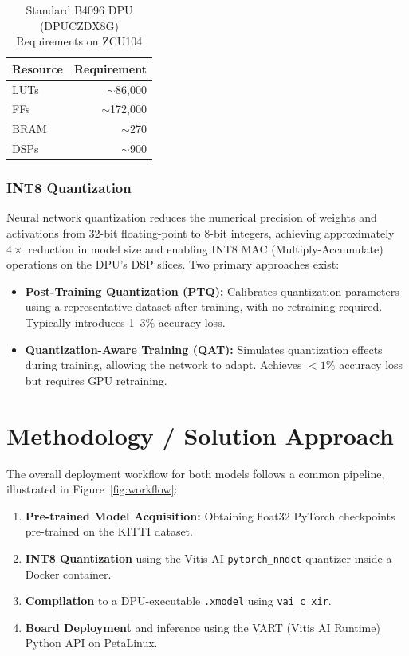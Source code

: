 \documentclass[12pt, a4paper]{report}
\begin{document}
\begin{table}[H]
\centering
\caption{Standard B4096 DPU (DPUCZDX8G) Requirements on ZCU104}
\label{tab:dpu_arch_req}
\begin{tabular}{@{}lr@{}}
\toprule
\textbf{Resource} & \textbf{Requirement} \\
\midrule
LUTs & $\sim$86,000 \\
FFs & $\sim$172,000 \\
BRAM & $\sim$270 \\
DSPs & $\sim$900 \\
\bottomrule
\end{tabular}
\end{table}

\subsection{INT8 Quantization}
Neural network quantization \cite{quantwhitepaper2021} reduces the numerical precision of weights and activations from 32-bit floating-point to 8-bit integers, achieving approximately $4\times$ reduction in model size and enabling INT8 MAC (Multiply-Accumulate) operations on the DPU's DSP slices. Two primary approaches exist:
\begin{itemize}[nosep]
    \item \textbf{Post-Training Quantization (PTQ):} Calibrates quantization parameters using a representative dataset after training, with no retraining required. Typically introduces 1--3\% accuracy loss.
    \item \textbf{Quantization-Aware Training (QAT):} Simulates quantization effects during training, allowing the network to adapt. Achieves $<1\%$ accuracy loss but requires GPU retraining.
\end{itemize}


\chapter{Methodology / Solution Approach}

The overall deployment workflow for both models follows a common pipeline, illustrated in Figure~\ref{fig:workflow}:

\begin{enumerate}[nosep]
    \item \textbf{Pre-trained Model Acquisition:} Obtaining float32 PyTorch checkpoints pre-trained on the KITTI dataset.
    \item \textbf{INT8 Quantization} using the Vitis AI \texttt{pytorch\_nndct} quantizer inside a Docker container.
    \item \textbf{Compilation} to a DPU-executable \texttt{.xmodel} using \texttt{vai\_c\_xir}.
    \item \textbf{Board Deployment} and inference using the VART (Vitis AI Runtime) Python API on PetaLinux.
\end{enumerate}
\end{document}
